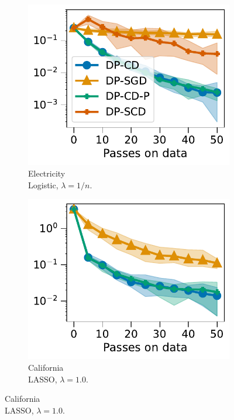 \begin{figure}[t]
\begin{subfigure}{0.048\linewidth}
    \begin{minipage}{.1cm}
      \vfill
    \end{minipage}
  \end{subfigure}%
  \begin{subfigure}{0.29\linewidth}
    \centering
    \includegraphics[width=\linewidth]{plots/optimization_electricity_raw.pdf}
    \caption{Electricity\\ Logistic, $\lambda=1/n$.}
    \label{fig:expe-logreg-constant}
  \end{subfigure}%
  \begin{subfigure}{0.29\linewidth}
    \centering
    \includegraphics[width=\linewidth]{plots/optimization_california_raw.pdf}
    \caption{California\\ LASSO, $\lambda=1.0$.}
    \label{fig:expe-logreg-power-law-sparse}
  \end{subfigure}


\end{figure}
